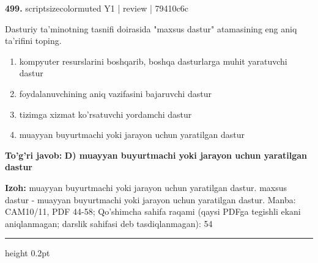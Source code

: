 \documentclass[10pt,a4paper]{article}
\begin{document}
{\bfseries\sffamily\color{ink} 499.} {scriptsizecolor{muted} Y1 | review | 79410c6c}
\par
Dasturiy ta'minotning tasnifi doirasida "maxsus dastur" atamasining eng aniq ta'rifini toping.
\begin{enumerate}[label=\Alph*),leftmargin=9mm]
\item kompyuter resurslarini boshqarib, boshqa dasturlarga muhit yaratuvchi dastur
\item foydalanuvchining aniq vazifasini bajaruvchi dastur
\item tizimga xizmat ko'rsatuvchi yordamchi dastur
\item muayyan buyurtmachi yoki jarayon uchun yaratilgan dastur
\end{enumerate}
\begin{tcolorbox}[enhanced,breakable,colback=teal!4,colframe=teal!60!black,boxrule=0.45pt,arc=1.2mm,left=2.7mm,right=2.7mm,top=1.8mm,bottom=1.8mm,before skip=2mm,after skip=2mm]
{\bfseries\sffamily\color{teal}To'g'ri javob:} \textbf{D) muayyan buyurtmachi yoki jarayon uchun yaratilgan dastur}
\par\smallskip
{\bfseries Izoh:} muayyan buyurtmachi yoki jarayon uchun yaratilgan dastur. maxsus dastur - muayyan buyurtmachi yoki jarayon uchun yaratilgan dastur. Manba: CAM10/11, PDF 44-58; Qo'shimcha sahifa raqami (qaysi PDFga tegishli ekani aniqlanmagan; darslik sahifasi deb tasdiqlanmagan): 54
\end{tcolorbox}
\vspace{2mm}\hrule height 0.2pt\vspace{3mm}
\end{document}
